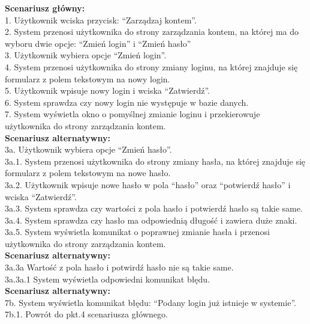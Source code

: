 \textbf{Scenariusz główny:}\\
	1. Użytkownik wciska przycisk: “Zarządzaj kontem”.\\
	2. System przenosi użytkownika do strony zarządzania kontem, na której ma do wyboru
	dwie opcje: “Zmień login” i “Zmień hasło”\\
	3. Użytkownik wybiera opcje “Zmień login”.\\
	4. System przenosi użytkownika do strony zmiany loginu, na której znajduje się
	formularz z polem tekstowym na nowy login.\\
	5. Użytkownik wpisuje nowy login i wciska “Zatwierdź”.\\
	6. System sprawdza czy nowy login nie występuje w bazie danych.\\
	7. System wyświetla okno o pomyślnej zmianie loginu i przekierowuje użytkownika do
strony zarządzania kontem.\\
\textbf{Scenariusz alternatywny:}\\
3a. Użytkownik wybiera opcje “Zmień hasło”.\\
3a.1. System przenosi użytkownika do strony zmiany hasła, na której znajduje się formularz
z polem tekstowym na nowe hasło.\\
3a.2. Użytkownik wpisuje nowe hasło w pola “hasło” oraz “potwierdź hasło” i wciska
“Zatwierdź”.\\
3a.3. System sprawdza czy wartości z pola hasło i potwierdź hasło są takie same.\\
3a.4. System sprawdza czy hasło ma odpowiednią długość i zawiera duże znaki.\\
3a.5. System wyświetla komunikat o poprawnej zmianie hasła i przenosi użytkownika do
strony zarządzania kontem.\\
\textbf{Scenariusz alternatywny:}\\
3a.3a Wartość z pola hasło i potwirdź hasło nie są takie same.\\
3a.3a.1 System wyświetla odpowiedni komunikat błędu.\\
\textbf{Scenariusz alternatywny:}\\
7b. System wyświetla komunikat błędu: “Podany login już istnieje w systemie”.\\
7b.1. Powrót do pkt.4 scenariusza głównego.\\

